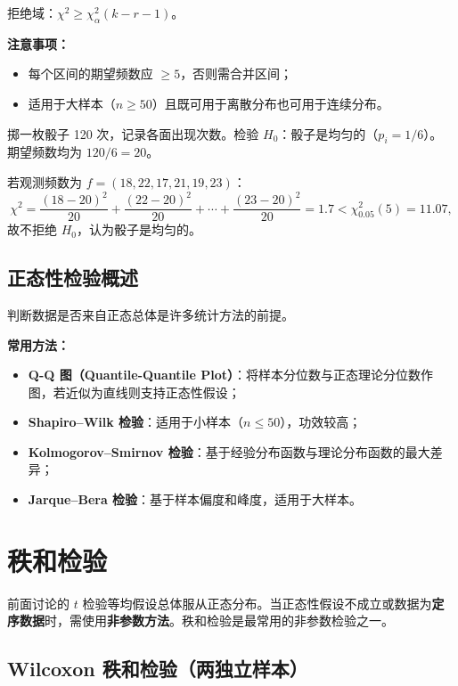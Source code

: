 拒绝域：$\chi^2 \ge \chi^2_{\alpha}(k - r - 1)$。

\textbf{注意事项：}
\begin{itemize}
    \item 每个区间的期望频数应 $\ge 5$，否则需合并区间；
    \item 适用于大样本（$n \ge 50$）且既可用于离散分布也可用于连续分布。
\end{itemize}

\begin{example}[检验骰子是否均匀]
掷一枚骰子 120 次，记录各面出现次数。检验 $H_0$：骰子是均匀的（$p_i = 1/6$）。
期望频数均为 $120/6 = 20$。

若观测频数为 $f = (18, 22, 17, 21, 19, 23)$：
\begin{equation}
    \chi^2 = \frac{(18-20)^2}{20} + \frac{(22-20)^2}{20} + \cdots + \frac{(23-20)^2}{20}
           = 1.7 < \chi^2_{0.05}(5) = 11.07,
\end{equation}
故不拒绝 $H_0$，认为骰子是均匀的。
\end{example}

\subsection{正态性检验概述}

判断数据是否来自正态总体是许多统计方法的前提。

\textbf{常用方法：}
\begin{itemize}
    \item \textbf{Q-Q 图（Quantile-Quantile Plot）}：将样本分位数与正态理论分位数作图，若近似为直线则支持正态性假设；
    \item \textbf{Shapiro--Wilk 检验}：适用于小样本（$n \le 50$），功效较高；
    \item \textbf{Kolmogorov--Smirnov 检验}：基于经验分布函数与理论分布函数的最大差异；
    \item \textbf{Jarque--Bera 检验}：基于样本偏度和峰度，适用于大样本。
\end{itemize}

\section{秩和检验}

前面讨论的 $t$ 检验等均假设总体服从正态分布。当正态性假设不成立或数据为\textbf{定序数据}时，需使用\textbf{非参数方法}。秩和检验是最常用的非参数检验之一。

\subsection{Wilcoxon 秩和检验（两独立样本）}

